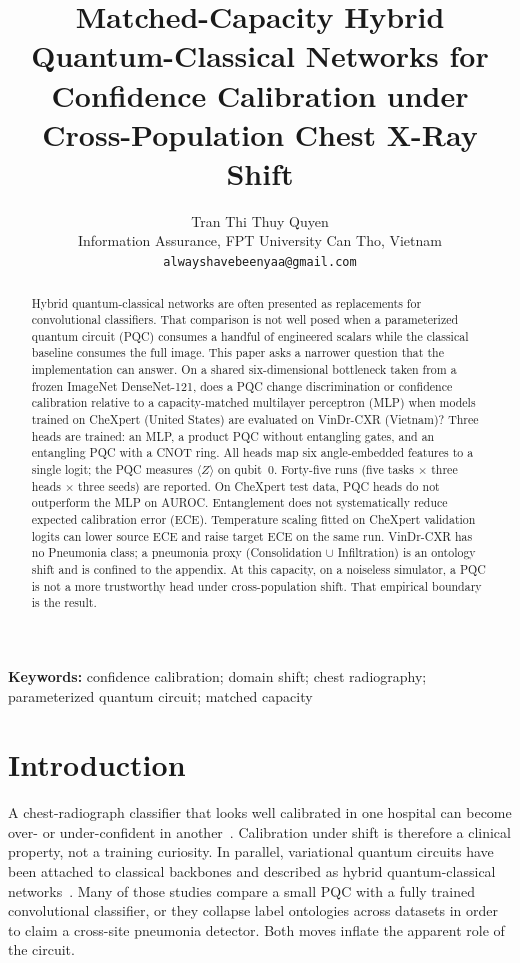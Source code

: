 \documentclass[11pt,a4paper]{article}
\title{Matched-Capacity Hybrid Quantum-Classical Networks for Confidence Calibration under Cross-Population Chest X-Ray Shift}
\author{Tran Thi Thuy Quyen\\
Information Assurance, FPT University Can Tho, Vietnam\\
\texttt{alwayshavebeenyaa@gmail.com}}
\date{}
\begin{document}
\maketitle

\begin{abstract}
Hybrid quantum-classical networks are often presented as replacements for convolutional classifiers. That comparison is not well posed when a parameterized quantum circuit (PQC) consumes a handful of engineered scalars while the classical baseline consumes the full image. This paper asks a narrower question that the implementation can answer. On a shared six-dimensional bottleneck taken from a frozen ImageNet DenseNet-121, does a PQC change discrimination or confidence calibration relative to a capacity-matched multilayer perceptron (MLP) when models trained on CheXpert (United States) are evaluated on VinDr-CXR (Vietnam)? Three heads are trained: an MLP, a product PQC without entangling gates, and an entangling PQC with a CNOT ring. All heads map six angle-embedded features to a single logit; the PQC measures $\langle Z\rangle$ on qubit~0. Forty-five runs (five tasks $\times$ three heads $\times$ three seeds) are reported. On CheXpert test data, PQC heads do not outperform the MLP on AUROC. Entanglement does not systematically reduce expected calibration error (ECE). Temperature scaling fitted on CheXpert validation logits can lower source ECE and raise target ECE on the same run. VinDr-CXR has no Pneumonia class; a pneumonia proxy (Consolidation $\cup$ Infiltration) is an ontology shift and is confined to the appendix. At this capacity, on a noiseless simulator, a PQC is not a more trustworthy head under cross-population shift. That empirical boundary is the result.
\end{abstract}

\noindent\textbf{Keywords:} confidence calibration; domain shift; chest radiography; parameterized quantum circuit; matched capacity

\section{Introduction}

A chest-radiograph classifier that looks well calibrated in one hospital can become over- or under-confident in another~\citep{ovadia2019shift,zech2018variable}. Calibration under shift is therefore a clinical property, not a training curiosity. In parallel, variational quantum circuits have been attached to classical backbones and described as hybrid quantum-classical networks~\citep{benedetti2019pqc,cerezo2021vqa}. Many of those studies compare a small PQC with a fully trained convolutional classifier, or they collapse label ontologies across datasets in order to claim a cross-site pneumonia detector. Both moves inflate the apparent role of the circuit.
\end{document}
